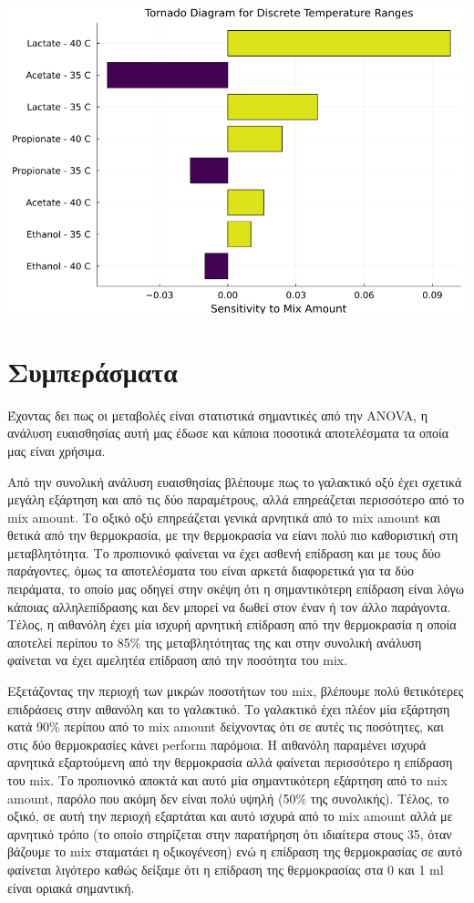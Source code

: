 \documentclass[11pt]{article}
\begin{document}
\begin{center}
\includegraphics[width=.9\linewidth]{../plots/sensitivity/temperature_tornado.png}
\end{center}

\section{Συμπεράσματα}
\label{sec:org6af63cf}
Έχοντας δει πως οι μεταβολές είναι στατιστικά σημαντικές από την ANOVA, η ανάλυση ευαισθησίας αυτή μας έδωσε και κάποια ποσοτικά αποτελέσματα τα οποία μας είναι χρήσιμα.

Από την συνολική ανάλυση ευαισθησίας βλέπουμε πως το γαλακτικό οξύ έχει σχετικά μεγάλη εξάρτηση και από τις δύο παραμέτρους, αλλά επηρεάζεται περισσότερο από το mix amount. Το οξικό οξύ επηρεάζεται γενικά αρνητικά από το mix amount και θετικά από την θερμοκρασία, με την θερμοκρασία να είανι πολύ πιο καθοριστική στη μεταβλητότητα. Το προπιονικό φαίνεται να έχει ασθενή επίδραση και με τους δύο παράγοντες, όμως τα αποτελέσματα του είναι αρκετά διαφορετικά για τα δύο πειράματα, το οποίο μας οδηγεί στην σκέψη ότι η σημαντικότερη επίδραση είναι λόγω κάποιας αλληλεπίδρασης και δεν μπορεί να δωθεί στον έναν ή τον άλλο παράγοντα. Τέλος, η αιθανόλη έχει μία ισχυρή αρνητική επίδραση από την θερμοκρασία η οποία αποτελεί περίπου το 85\% της μεταβλητότητας της και στην συνολική ανάλυση φαίνεται να έχει αμελητέα επίδραση από την ποσότητα του mix.

Εξετάζοντας την περιοχή των μικρών ποσοτήτων του mix, βλέπουμε πολύ θετικότερες επιδράσεις στην αιθανόλη και το γαλακτικό. Το γαλακτικό έχει πλέον μία εξάρτηση κατά 90\% περίπου από το mix amount δείχνοντας ότι σε αυτές τις ποσότητες, και στις δύο θερμοκρασίες κάνει perform παρόμοια. Η αιθανόλη παραμένει ισχυρά αρνητικά εξαρτούμενη από την θερμοκρασία αλλά φαίνεται περισσότερο η επίδραση του mix. Το προπιονικό αποκτά και αυτό μία σημαντικότερη εξάρτηση από το mix amount, παρόλο που ακόμη δεν είναι πολύ υψηλή (50\% της συνολικής). Τέλος, το οξικό, σε αυτή την περιοχή εξαρτάται και αυτό ισχυρά από το mix amount αλλά με αρνητικό τρόπο (το οποίο στηρίζεται στην παρατήρηση ότι ιδιαίτερα στους 35, όταν βάζουμε το mix σταματάει η οξικογένεση) ενώ η επίδραση της θερμοκρασίας σε αυτό φαίνεται λιγότερο καθώς δείξαμε ότι η επίδραση της θερμοκρασίας στα 0 και 1 ml είναι οριακά σημαντική.
\end{document}
